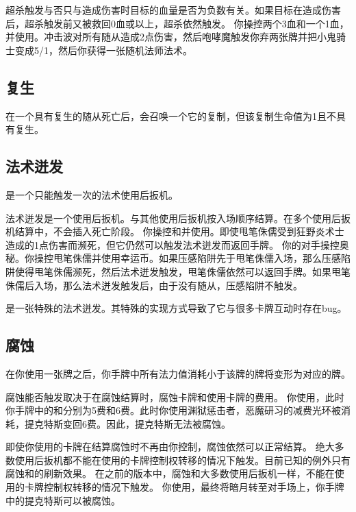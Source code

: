 超杀触发与否只与造成伤害时目标的血量是否为负数有关。如果目标在造成伤害后，超杀触发前又被救回0血或以上，超杀依然触发。
\example 你操控两个3血和一个1血，并使用。冲击波对所有随从造成2点伤害，然后咆哮魔触发你弃两张牌并把小鬼骑士变成5/1，然后你获得一张随机法师法术。

\subsection{复生}
\label{reborn}

在一个具有复生的随从死亡后，会召唤一个它的复制，但该复制生命值为1且不具有复生。

\subsection{法术迸发}
\label{spellburst}

是一个只能触发一次的法术使用后扳机。

法术迸发是一个使用后扳机。与其他使用后扳机按入场顺序结算。在多个使用后扳机结算中，不会插入死亡阶段。
\example 你操控和并使用。即使甩笔侏儒受到狂野炎术士造成的1点伤害而濒死，但它仍然可以触发法术迸发而返回手牌。
\example 你的对手操控奥秘。你操控甩笔侏儒并使用幸运币。如果压感陷阱先于甩笔侏儒入场，那么压感陷阱使得甩笔侏儒濒死，然后法术迸发触发，甩笔侏儒依然可以返回手牌。如果甩笔侏儒后入场，那么法术迸发触发后，由于没有随从，压感陷阱不触发。

是一张特殊的法术迸发。其特殊的实现方式导致了它与很多卡牌互动时存在bug。

\subsection{腐蚀}
\label{corrupt}

在你使用一张牌之后，你手牌中所有法力值消耗小于该牌的牌将变形为对应的牌。

腐蚀能否触发取决于在腐蚀结算时，腐蚀卡牌和使用卡牌的费用。
\example 你使用，此时你手牌中的和分别为5费和6费。此时你使用渊狱惩击者，恶魔研习的减费光环被消耗，提克特斯变回6费。因此，提克特斯无法被腐蚀。

即使你使用的卡牌在结算腐蚀时不再由你控制，腐蚀依然可以正常结算。
\notice 绝大多数使用后扳机都不能在使用的卡牌控制权转移的情况下触发。目前已知的例外只有腐蚀和的刷新效果。
\notice {}在之前的版本中，腐蚀和大多数使用后扳机一样，不能在使用的卡牌控制权转移的情况下触发。
\example 你使用，最终将暗月转至对手场上，你手牌中的提克特斯可以被腐蚀。


